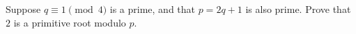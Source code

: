 \documentclass{subfile}
\begin{document}
	
	\begin{problem}
		Suppose $q\equiv 1\pmod 4$ is a prime, and that $p=2q+1$ is also prime. Prove that $2$ is a primitive root modulo $p$. %
	\end{problem}
	
\end{document}

